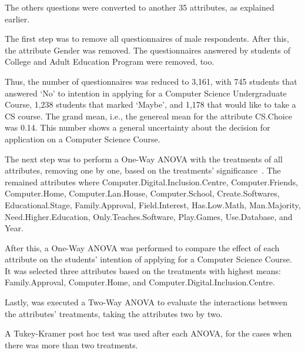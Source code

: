 The others questions were converted to another 35 attributes, as explained earlier.

The first step was to remove all questionnaires of male respondents. After this, the attribute Gender was removed. The questionnaires answered by students of College and Adult Education Program were removed, too.

Thus, the number of questionnaires was reduced to 3,161, with 745 students that answered `No' to intention in applying for a Computer Science Undergraduate Course, 1,238 students that marked `Maybe', and 1,178 that would like to take a CS course. The grand mean, i.e., the genereal mean for the attribute CS.Choice was 0.14. This number shows a general uncertainty about the decision for application on a Computer Science Course. 

The next step was to perform a One-Way ANOVA with the treatments of all attributes, removing one by one, based on the treatments' significance~\cite{Chambers1990}. The remained attributes where Computer.Digital.Inclusion.Centre, Computer.Friends, Computer.Home, Computer.Lan.House, Computer.School, Create.Softwares, Educational.Stage, Family.Approval, Field.Interest, Has.Low.Math, Man.Majority, Need.Higher.Education, Only.Teaches.Software, Play.Games, Use.Database, and Year.

After this, a One-Way ANOVA was performed to compare the effect of each attribute on the students' intention of applying for a Computer Science Course. It was selected three attributes based on the treatments with highest means: Family.Approval, Computer.Home, and Computer.Digital.Inclusion.Centre.

Lastly, was executed a Two-Way ANOVA to evaluate the interactions between the attributes' treatments, taking the attributes two by two.   

A Tukey-Kramer post hoc test was used after each ANOVA, for the cases when there was more than two treatments.

